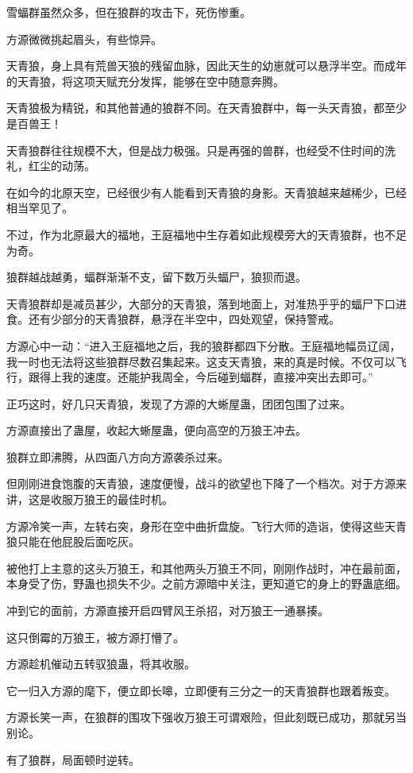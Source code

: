 \begin{this_body}
雪蝠群虽然众多，但在狼群的攻击下，死伤惨重。

方源微微挑起眉头，有些惊异。

天青狼，身上具有荒兽天狼的残留血脉，因此天生的幼崽就可以悬浮半空。而成年的天青狼，将这项天赋充分发挥，能够在空中随意奔腾。

天青狼极为精锐，和其他普通的狼群不同。在天青狼群中，每一头天青狼，都至少是百兽王！

天青狼群往往规模不大，但是战力极强。只是再强的兽群，也经受不住时间的洗礼，红尘的动荡。

在如今的北原天空，已经很少有人能看到天青狼的身影。天青狼越来越稀少，已经相当罕见了。

不过，作为北原最大的福地，王庭福地中生存着如此规模旁大的天青狼群，也不足为奇。

狼群越战越勇，蝠群渐渐不支，留下数万头蝠尸，狼狈而退。

天青狼群却是减员甚少，大部分的天青狼，落到地面上，对准热乎乎的蝠尸下口进食。还有少部分的天青狼群，悬浮在半空中，四处观望，保持警戒。

方源心中一动：“进入王庭福地之后，我的狼群都四下分散。王庭福地幅员辽阔，我一时也无法将这些狼群尽数召集起来。这支天青狼，来的真是时候。不仅可以飞行，跟得上我的速度。还能护我周全，今后碰到蝠群，直接冲突出去即可。”

正巧这时，好几只天青狼，发现了方源的大蜥屋蛊，团团包围了过来。

方源直接出了蛊屋，收起大蜥屋蛊，便向高空的万狼王冲去。

狼群立即沸腾，从四面八方向方源袭杀过来。

但刚刚进食饱腹的天青狼，速度便慢，战斗的欲望也下降了一个档次。对于方源来讲，这是收服万狼王的最佳时机。

方源冷笑一声，左转右突，身形在空中曲折盘旋。飞行大师的造诣，使得这些天青狼只能在他屁股后面吃灰。

被他打上主意的这头万狼王，和其他两头万狼王不同，刚刚作战时，冲在最前面，本身受了伤，野蛊也损失不少。之前方源暗中关注，更知道它的身上的野蛊底细。

冲到它的面前，方源直接开启四臂风王杀招，对万狼王一通暴揍。

这只倒霉的万狼王，被方源打懵了。

方源趁机催动五转驭狼蛊，将其收服。

它一归入方源的麾下，便立即长嗥，立即便有三分之一的天青狼群也跟着叛变。

方源长笑一声，在狼群的围攻下强收万狼王可谓艰险，但此刻既已成功，那就另当别论。

有了狼群，局面顿时逆转。


\end{this_body}
